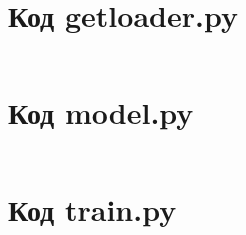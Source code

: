 \documentclass[bachelor, och, coursework]{SCWorks}
\begin{document}
\appendix

    \section{Код getloader.py}
    \inputminted[fontsize=\footnotesize]{python}{model-ver-2/getloader.py}

    \section{Код model.py}
    \inputminted[fontsize=\footnotesize]{python}{model-ver-2/model.py}

    \section{Код train.py}
    \inputminted[fontsize=\footnotesize]{python}{model-ver-2/train.py}
\end{document}
